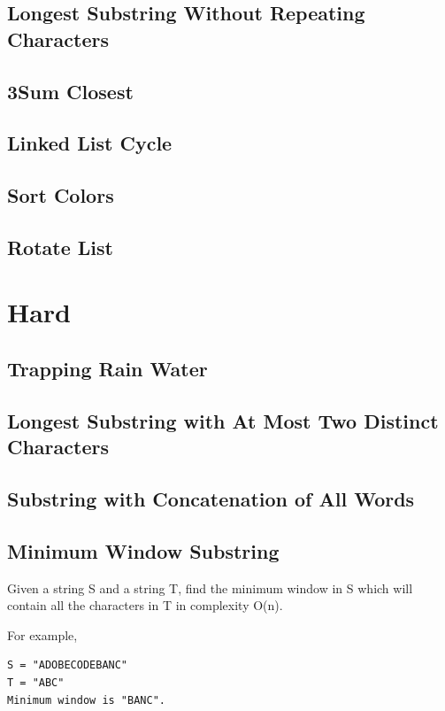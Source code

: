 \documentclass[12pt]{book}
\begin{document}
\subsection{Longest Substring Without Repeating Characters}
\label{sec-15-2-8}
\subsection{3Sum Closest}
\label{sec-15-2-9}
\subsection{Linked List Cycle}
\label{sec-15-2-10}
\subsection{Sort Colors}
\label{sec-15-2-11}
\subsection{Rotate List}
\label{sec-15-2-12}
\section{Hard}
\label{sec-15-3}
\subsection{Trapping Rain Water}
\label{sec-15-3-1}
\subsection{Longest Substring with At Most Two Distinct Characters}
\label{sec-15-3-2}
\subsection{Substring with Concatenation of All Words}
\label{sec-15-3-3}
\subsection{Minimum Window Substring}
\label{sec-15-3-4}
Given a string S and a string T, find the minimum window in S which will contain all the characters in T in complexity O(n).

For example,
\lstset{language=java,label= ,caption= ,numbers=none}
\begin{lstlisting}
S = "ADOBECODEBANC"
T = "ABC"
Minimum window is "BANC".
\end{lstlisting}
\end{document}
